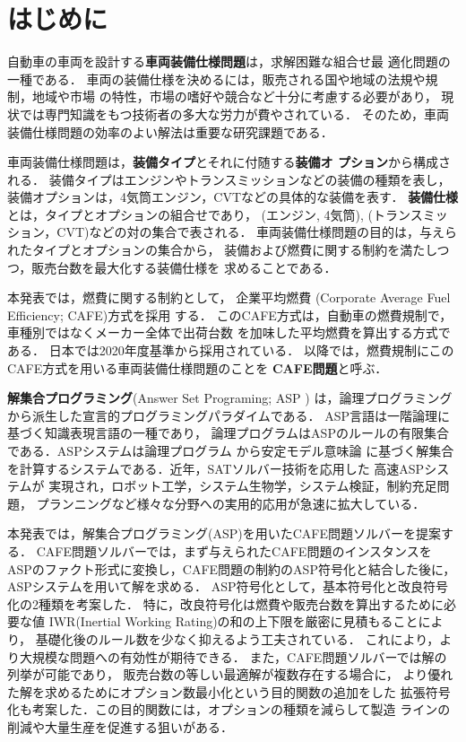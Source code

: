 \section{はじめに}
自動車の車両を設計する\textbf{車両装備仕様問題}は，求解困難な組合せ最
適化問題の一種である．
%
車両の装備仕様を決めるには，販売される国や地域の法規や規制，地域や市場
の特性，市場の嗜好や競合など十分に考慮する必要があり，
現状では専門知識をもつ技術者の多大な労力が費やされている．
そのため，車両装備仕様問題の効率のよい解法は重要な研究課題である．

車両装備仕様問題は，\textbf{装備タイプ}とそれに付随する\textbf{装備オ
プション}から構成される．
装備タイプはエンジンやトランスミッションなどの装備の種類を表し，
装備オプションは，4気筒エンジン，CVTなどの具体的な装備を表す．
%
\textbf{装備仕様}とは，タイプとオプションの組合せであり，
(エンジン, 4気筒), (トランスミッション，CVT)などの対の集合で表される．
車両装備仕様問題の目的は，与えられたタイプとオプションの集合から，
装備および燃費に関する制約を満たしつつ，販売台数を最大化する装備仕様を
求めることである．

本発表では，燃費に関する制約として，
企業平均燃費 (Corporate Average Fuel Efficiency; CAFE)方式を採用
する．
このCAFE方式は，自動車の燃費規制で，車種別ではなくメーカー全体で出荷台数
を加味した平均燃費を算出する方式である．
日本では2020年度基準から採用されている．
以降では，燃費規制にこのCAFE方式を用いる車両装備仕様問題のことを
\textbf{CAFE問題}と呼ぶ．



\textbf{解集合プログラミング}(Answer Set Programing; ASP \cite{%
  Baral03:cambridge,%
  Gelfond88:iclp,%
  Inoue08:jssst})
は，論理プログラミングから派生した宣言的プログラミングパラダイムである．
ASP言語は一階論理に基づく知識表現言語の一種であり，
論理プログラムはASPのルールの有限集合である．ASPシステムは論理プログラム
から安定モデル意味論 \cite{Gelfond88:iclp}
に基づく解集合を計算するシステムである．近年，SATソルバー技術を応用した
高速ASPシステムが
実現され，ロボット工学，システム生物学，システム検証，制約充足問題，
プランニングなど様々な分野への実用的応用が急速に拡大している\cite{%
Gelfond16:aim}．

本発表では，解集合プログラミング(ASP)を用いたCAFE問題ソルバーを提案する．
CAFE問題ソルバーでは，まず与えられたCAFE問題のインスタンスを
ASPのファクト形式に変換し，CAFE問題の制約のASP符号化と結合した後に，
ASPシステムを用いて解を求める．
ASP符号化として，基本符号化と改良符号化の2種類を考案した．
特に，改良符号化は燃費や販売台数を算出するために必要な値
IWR(Inertial Working Rating)の和の上下限を厳密に見積もることにより，
基礎化後のルール数を少なく抑えるよう工夫されている．
これにより，より大規模な問題への有効性が期待できる．
また，CAFE問題ソルバーでは解の列挙が可能であり，
販売台数の等しい最適解が複数存在する場合に，
より優れた解を求めるためにオプション数最小化という目的関数の追加をした
拡張符号化も考案した．この目的関数には，オプションの種類を減らして製造
ラインの削減や大量生産を促進する狙いがある．


